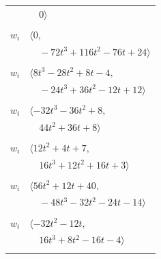 \documentclass[11pt]{article}
\begin{document}
\begin{longtable}{@{}ll@{}}
 & $\quad 0\rangle$\\
\addlinespace[2pt]
\multicolumn{2}{@{}p{0.97\textwidth}@{}}{$i=12$, $D_i=4$, $\rho_{ij}$: $3{:}3, \allowbreak 4{:}1, \allowbreak 5{:}3, \allowbreak 22{:}2, \allowbreak 24{:}3, \allowbreak 31{:}1, \allowbreak 34{:}3, \allowbreak 36{:}3, \allowbreak 42{:}3$}\\
$w_i$ & $\langle 0,$\\
 & $\quad -72t^{3}+116t^{2}-76t+24\rangle$\\
\addlinespace[2pt]
\multicolumn{2}{@{}p{0.97\textwidth}@{}}{$i=13$, $D_i=4$, $\rho_{ij}$: $0{:}1, \allowbreak 6{:}3, \allowbreak 20{:}1, \allowbreak 23{:}1, \allowbreak 26{:}1, \allowbreak 33{:}3, \allowbreak 41{:}3$}\\
$w_i$ & $\langle 8t^{3}-28t^{2}+8t-4,$\\
 & $\quad -24t^{3}+36t^{2}-12t+12\rangle$\\
\addlinespace[2pt]
\multicolumn{2}{@{}p{0.97\textwidth}@{}}{$i=14$, $D_i=2$, $\rho_{ij}$: $2{:}1, \allowbreak 18{:}1, \allowbreak 25{:}3, \allowbreak 30{:}3, \allowbreak 34{:}2, \allowbreak 40{:}1, \allowbreak 42{:}3$}\\
$w_i$ & $\langle -32t^{3}-36t^{2}+8,$\\
 & $\quad 44t^{2}+36t+8\rangle$\\
\addlinespace[2pt]
\multicolumn{2}{@{}p{0.97\textwidth}@{}}{$i=15$, $D_i=1$, $e_i=8$, $\rho_{ij}$: $1{:}2, \allowbreak 26{:}2, \allowbreak 42{:}2$}\\
$w_i$ & $\langle 12t^{2}+4t+7,$\\
 & $\quad 16t^{3}+12t^{2}+16t+3\rangle$\\
\addlinespace[2pt]
\multicolumn{2}{@{}p{0.97\textwidth}@{}}{$i=16$, $D_i=2$, $e_i=2$, $\rho_{ij}$: $1{:}2, \allowbreak 6{:}1, \allowbreak 7{:}3, \allowbreak 17{:}3, \allowbreak 23{:}1, \allowbreak 27{:}1, \allowbreak 29{:}3, \allowbreak 42{:}2$}\\
$w_i$ & $\langle 56t^{2}+12t+40,$\\
 & $\quad -48t^{3}-32t^{2}-24t-14\rangle$\\
\addlinespace[2pt]
\multicolumn{2}{@{}p{0.97\textwidth}@{}}{$i=17$, $D_i=1$, $\rho_{ij}$: $6{:}3, \allowbreak 8{:}3, \allowbreak 16{:}1, \allowbreak 29{:}2, \allowbreak 33{:}1, \allowbreak 39{:}1, \allowbreak 42{:}3$}\\
$w_i$ & $\langle -32t^{2}-12t,$\\
 & $\quad 16t^{3}+8t^{2}-16t-4\rangle$\\
\addlinespace[2pt]
\multicolumn{2}{@{}p{0.97\textwidth}@{}}{$i=18$, $D_i=1$, $e_i=2$, $\rho_{ij}$: $14{:}3, \allowbreak 20{:}2, \allowbreak 24{:}2, \allowbreak 25{:}1, \allowbreak 34{:}1, \allowbreak 39{:}2, \allowbreak 40{:}1$}\\

\end{longtable}
\end{document}
